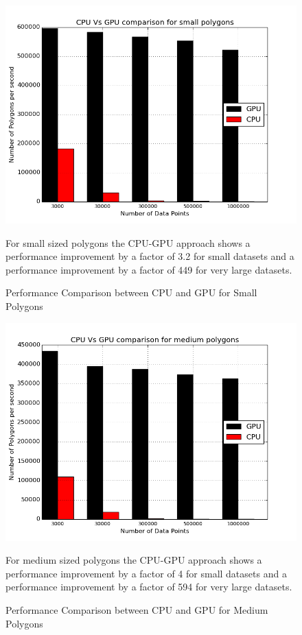 \documentclass{article}
\begin{document}
\begin{figure}[ht]
\caption{Performance Comparison between CPU and GPU for Small Polygons}
\includegraphics[scale=0.5]{CPU_GPU_SmallPoly3}

For small sized polygons the CPU-GPU approach shows a performance improvement by a factor of 3.2 for small datasets and a performance improvement by a factor of 449 for very large datasets.
\end{figure}

\begin{figure}[ht]
\caption{Performance Comparison between CPU and GPU for Medium Polygons}
\includegraphics[scale=0.5]{CPU_GPU_MediumPoly3}

For medium sized polygons the CPU-GPU approach shows a performance improvement by a factor of 4 for small datasets and a performance improvement by a factor of 594 for very large datasets.
\end{figure}
\end{document}
